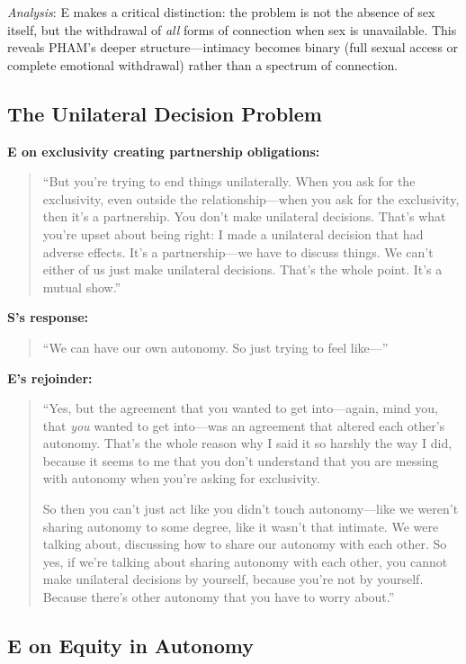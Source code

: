 \documentclass[12pt,openany]{book}
\numberwithin{equation}{chapter}
\begin{document}
\textit{Analysis}: E makes a critical distinction: the problem is not the absence of sex itself, but the withdrawal of \textit{all} forms of connection when sex is unavailable. This reveals PHAM's deeper structure---intimacy becomes binary (full sexual access or complete emotional withdrawal) rather than a spectrum of connection.

\subsection{The Unilateral Decision Problem}

\textbf{E on exclusivity creating partnership obligations:}
\begin{quote}
``But you're trying to end things unilaterally. When you ask for the exclusivity, even outside the relationship---when you ask for the exclusivity, then it's a partnership. You don't make unilateral decisions. That's what you're upset about being right: I made a unilateral decision that had adverse effects. It's a partnership---we have to discuss things. We can't either of us just make unilateral decisions. That's the whole point. It's a mutual show.''
\end{quote}

\textbf{S's response:}
\begin{quote}
``We can have our own autonomy. So just trying to feel like---''
\end{quote}

\textbf{E's rejoinder:}
\begin{quote}
``Yes, but the agreement that you wanted to get into---again, mind you, that \textit{you} wanted to get into---was an agreement that altered each other's autonomy. That's the whole reason why I said it so harshly the way I did, because it seems to me that you don't understand that you are messing with autonomy when you're asking for exclusivity.

So then you can't just act like you didn't touch autonomy---like we weren't sharing autonomy to some degree, like it wasn't that intimate. We were talking about, discussing how to share our autonomy with each other. So yes, if we're talking about sharing autonomy with each other, you cannot make unilateral decisions by yourself, because you're not by yourself. Because there's other autonomy that you have to worry about.''
\end{quote}

\subsection{E on Equity in Autonomy}
\end{document}
